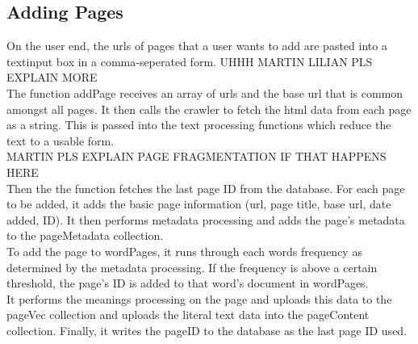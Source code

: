 \subsection{Adding Pages}
On the user end, the urls of pages that a user wants to add are pasted into a textinput box in a comma-seperated form. UHHH MARTIN LILIAN PLS EXPLAIN MORE \\

The function addPage receives an array of urls and the base url that is common amongst all pages. It then calls the crawler to fetch the html data from each page as a string. This is passed into the text processing functions which reduce the text to a usable form. \\
MARTIN PLS EXPLAIN PAGE FRAGMENTATION IF THAT HAPPENS HERE \\
Then the the function fetches the last page ID from the database. For each page to be added, it adds the basic page information (url, page title, base url, date added, ID). It then performs metadata processing and adds the page's metadata to the pageMetadata collection. \\
To add the page to wordPages, it runs through each words frequency as determined by the metadata processing. If the frequency is above a certain threshold, the page's ID is added to that word's document in wordPages. \\
It performs the meanings processing on the page and uploads this data to the pageVec collection and uploads the literal text data into the pageContent collection. Finally, it writes the pageID to the database as the last page ID used.
